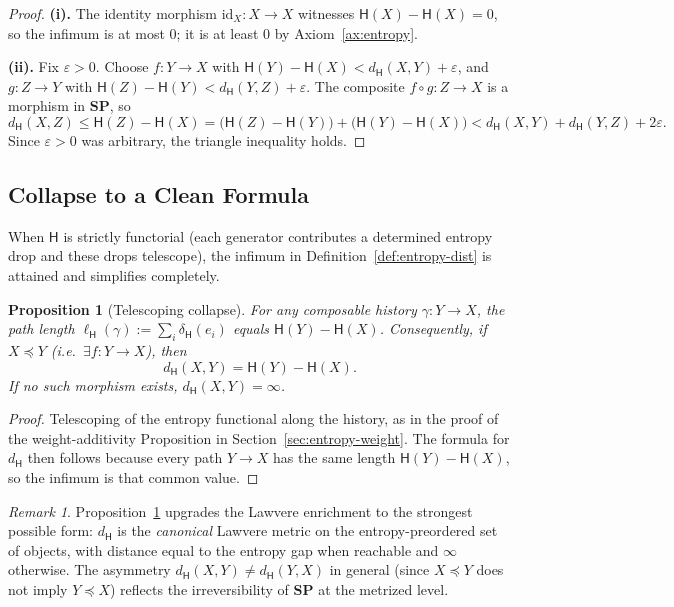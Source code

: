 \documentclass[12pt,a4paper]{article}
\newtheorem{proposition}[theorem]{Proposition}
\theoremstyle{definition}
\theoremstyle{remark}
\newtheorem{remark}[theorem]{Remark}
\newcommand{\Ent}{\ensuremath{\mathsf{H}}}
\newcommand{\SP}{\mathbf{SP}}
\providecommand{\id}{\mathrm{id}}
\renewcommand{\id}{\mathrm{id}}
\begin{document}
\begin{proof}
\textbf{(i).} The identity morphism $\id_X:X\to X$ witnesses $\Ent(X)-\Ent(X)=0$,
so the infimum is at most $0$; it is at least $0$ by Axiom~\ref{ax:entropy}.

\textbf{(ii).} Fix $\varepsilon>0$. Choose $f:Y\to X$ with
$\Ent(Y)-\Ent(X)<d_{\Ent}(X,Y)+\varepsilon$, and $g:Z\to Y$ with
$\Ent(Z)-\Ent(Y)<d_{\Ent}(Y,Z)+\varepsilon$. The composite $f\circ g:Z\to X$
is a morphism in $\SP$, so
\[
  d_{\Ent}(X,Z)\le\Ent(Z)-\Ent(X)
  =\bigl(\Ent(Z)-\Ent(Y)\bigr)+\bigl(\Ent(Y)-\Ent(X)\bigr)
  <d_{\Ent}(X,Y)+d_{\Ent}(Y,Z)+2\varepsilon.
\]
Since $\varepsilon>0$ was arbitrary, the triangle inequality holds.
\end{proof}

\subsection{Collapse to a Clean Formula}

When $\Ent$ is strictly functorial (each generator contributes a determined entropy
drop and these drops telescope), the infimum in Definition~\ref{def:entropy-dist}
is attained and simplifies completely.

\begin{proposition}[Telescoping collapse]
\label{prop:telescoping}
For any composable history $\gamma:Y\to X$, the path length
$\ell_{\Ent}(\gamma):=\sum_i\delta_{\Ent}(e_i)$ equals $\Ent(Y)-\Ent(X)$.
Consequently, if $X\preceq Y$ (i.e.\ $\exists f:Y\to X$), then
\[
  d_{\Ent}(X,Y) = \Ent(Y)-\Ent(X).
\]
If no such morphism exists, $d_{\Ent}(X,Y)=\infty$.
\end{proposition}

\begin{proof}
Telescoping of the entropy functional along the history, as in the proof of the
weight-additivity Proposition in Section~\ref{sec:entropy-weight}. The formula
for $d_{\Ent}$ then follows because every path $Y\to X$ has the same length
$\Ent(Y)-\Ent(X)$, so the infimum is that common value.
\end{proof}

\begin{remark}
Proposition~\ref{prop:telescoping} upgrades the Lawvere enrichment to the
strongest possible form: $d_{\Ent}$ is the \emph{canonical} Lawvere metric
on the entropy-preordered set of objects, with distance equal to the entropy
gap when reachable and $\infty$ otherwise. The asymmetry
$d_{\Ent}(X,Y)\ne d_{\Ent}(Y,X)$ in general (since $X\preceq Y$ does not
imply $Y\preceq X$) reflects the irreversibility of $\SP$ at the
metrized level.
\end{remark}
\end{document}
